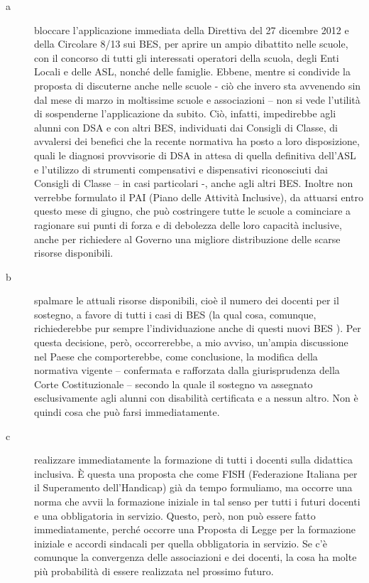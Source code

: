 \begin{description}
	\item[a]  bloccare l'applicazione immediata della Direttiva del 27 dicembre 2012 e della Circolare 8/13 sui BES, per aprire un ampio dibattito nelle scuole, con il concorso di tutti gli interessati operatori della scuola, degli Enti Locali e delle ASL, nonché delle famiglie.
	Ebbene, mentre si condivide la proposta di discuterne anche nelle scuole - ciò che invero sta avvenendo sin dal mese di marzo in moltissime scuole e associazioni – non si vede l'utilità di sospenderne l'applicazione da subito. Ciò, infatti, impedirebbe agli alunni con DSA e con altri BES, individuati dai Consigli di Classe, di avvalersi dei benefici che la recente normativa ha posto a loro disposizione, quali le diagnosi provvisorie di DSA in attesa di quella definitiva dell'ASL e l'utilizzo di strumenti compensativi e dispensativi riconosciuti dai Consigli di Classe – in casi particolari -, anche agli altri BES.
	Inoltre non verrebbe formulato il PAI (Piano delle Attività Inclusive), da attuarsi entro questo mese di giugno, che può costringere tutte le scuole a cominciare a ragionare sui punti di forza e di debolezza delle loro capacità inclusive, anche per richiedere al Governo una migliore distribuzione delle scarse risorse disponibili.
	\item [b]spalmare le attuali risorse disponibili, cioè il numero dei docenti per il sostegno, a favore di tutti i casi di BES (la qual cosa, comunque, richiederebbe pur sempre l'individuazione anche di questi nuovi BES ).
	Per questa decisione, però, occorrerebbe, a mio avviso, un'ampia discussione nel Paese che comporterebbe, come conclusione, la modifica della normativa vigente – confermata e rafforzata dalla giurisprudenza della Corte Costituzionale – secondo la quale il sostegno va assegnato esclusivamente agli alunni con disabilità certificata e a nessun altro. Non è quindi cosa che può farsi immediatamente.
	\item[c] realizzare immediatamente la formazione di tutti i docenti sulla didattica inclusiva.
	È questa una proposta che come FISH (Federazione Italiana per il Superamento dell'Handicap) già da tempo formuliamo, ma occorre una norma che avvii la formazione iniziale in tal senso per tutti i futuri docenti e una obbligatoria in servizio. Questo, però, non può essere fatto immediatamente, perché occorre una Proposta di Legge per la formazione iniziale e accordi sindacali per quella obbligatoria in servizio. Se c'è comunque la convergenza delle associazioni e dei docenti, la cosa ha molte più probabilità di essere realizzata nel prossimo futuro.

\end{description}
